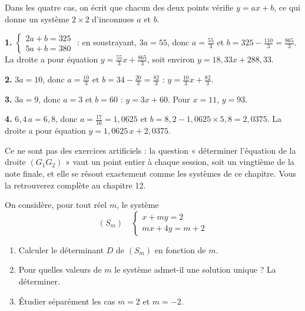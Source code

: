 \begin{corrige}[annales]
Dans les quatre cas, on écrit que chacun des deux points vérifie
$y = ax+b$, ce qui donne un système $2\times2$ d'inconnues $a$ et $b$.

\textbf{1.} $\begin{cases} 2a+b = 325\\ 5a+b = 380\end{cases}$ : en
soustrayant, $3a = 55$, donc $a = \frac{55}{3}$ et
$b = 325-\frac{110}{3} = \frac{865}{3}$. La droite a pour équation
$y = \frac{55}{3}x+\frac{865}{3}$, soit environ $y = 18{,}33x+288{,}33$.

\textbf{2.} $3a = 10$, donc $a = \frac{10}{3}$ et $b = 34-\frac{20}{3}
= \frac{82}{3}$ : $y = \frac{10}{3}x+\frac{82}{3}$.

\textbf{3.} $3a = 9$, donc $a = 3$ et $b = 60$ : $y = 3x+60$. Pour $x = 11$,
$y = 93$.

\textbf{4.} $6{,}4\,a = 6{,}8$, donc $a = \frac{17}{16} = 1{,}0625$ et
$b = 8{,}2-1{,}0625\times5{,}8 = 2{,}0375$. La droite a pour équation
$y = 1{,}0625\,x+2{,}0375$.
\end{corrige}

\begin{remarque}
Ce ne sont pas des exercices artificiels : la question « déterminer
l'équation de la droite $(G_{1}G_{2})$ » vaut un point entier à chaque
session, soit un vingtième de la note finale, et elle se résout exactement
comme les systèmes de ce chapitre. Vous la retrouverez complète au
chapitre 12.
\end{remarque}

\begin{jecherche}
On considère, pour tout réel $m$, le système
\[
  (S_{m}) \quad
  \begin{cases}
    x+my = 2\\
    mx+4y = m+2
  \end{cases}
\]

\begin{enumerate}[label=\textbf{\arabic*.}, leftmargin=*, itemsep=0.3em]
  \item Calculer le déterminant $D$ de $(S_{m})$ en fonction de $m$.
  \item Pour quelles valeurs de $m$ le système admet-il une solution unique ?
        La déterminer.
  \item Étudier séparément les cas $m = 2$ et $m = -2$.
\end{enumerate}
\end{jecherche}

